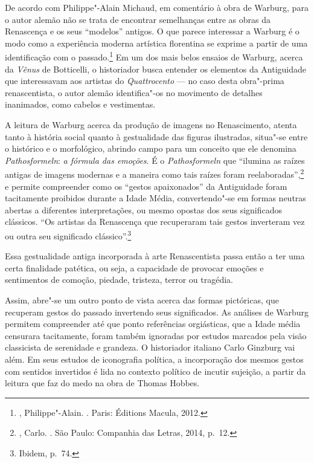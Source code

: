 De acordo com Philippe"-Alain Michaud, em comentário à obra de Warburg,
para o autor alemão não se trata de encontrar semelhanças entre as obras
da Renascença e os seus ``modelos'' antigos. O que parece interessar a Warburg é o modo como a experiência moderna artística florentina se exprime a partir de uma identificação com o passado.\footnote{, Philippe"-Alain. {}. Paris: Éditions Macula, 2012.}
Em um dos mais belos ensaios de Warburg, acerca da
\emph{Vênus} de Botticelli, o historiador busca entender os elementos da
Antiguidade que interessavam aos artistas do \emph{Quattrocento} --- no
caso desta obra"-prima renascentista, o autor alemão identifica"-os no
movimento de detalhes inanimados, como cabelos e vestimentas.

A leitura de Warburg acerca da produção de imagens no Renascimento,
atenta tanto à história social quanto à gestualidade das figuras
ilustradas, situa"-se entre o histórico e o morfológico, abrindo campo
para um conceito que ele denomina \emph{Pathosformeln}:
\emph{a fórmula das emoções}. É o \emph{Pathosformeln} que ``ilumina as
raízes antigas de imagens modernas e a maneira como tais raízes foram
reelaboradas'',\footnote{, Carlo. {}. São Paulo: Companhia das Letras, 2014, p.~12.} e permite compreender como os ``gestos apaixonados'' da Antiguidade foram
tacitamente proibidos durante a Idade Média, convertendo"-se em formas
neutras abertas a diferentes interpretações, ou mesmo opostas dos seus
significados clássicos. ``Os artistas da Renascença que recuperaram tais
gestos inverteram vez ou outra seu significado clássico''.\footnote{Ibidem, p.~74.}

Essa gestualidade antiga incorporada à arte Renascentista passa então a
ter uma certa finalidade patética, ou seja, a capacidade de provocar
emoções e sentimentos de comoção, piedade, tristeza, terror ou tragédia.

Assim, abre"-se um outro ponto de vista acerca das formas pictóricas, que
recuperam gestos do passado invertendo seus significados. As análises de
Warburg permitem compreender até que ponto referências orgiásticas, que
a Idade média censurara tacitamente, foram também ignoradas por estudos
marcados pela visão classicista de serenidade e grandeza. O historiador
italiano Carlo Ginzburg vai além. Em seus estudos de iconografia
política, a incorporação dos mesmos gestos com sentidos invertidos é
lida no contexto político de incutir sujeição, a partir da leitura que
faz do medo na obra de Thomas Hobbes.


